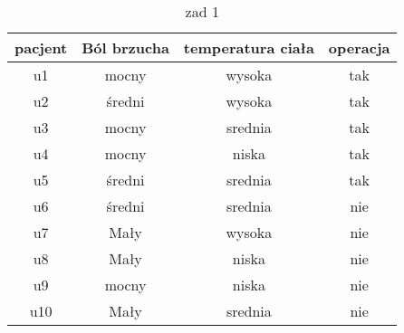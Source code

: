\documentclass[12pt, letterpaper, titlepage]{article}
\begin{document}
\begin{table}[h]
\centering\caption{zad 1}
\begin{tabular} {c|ccc}
\hline
\hline
pacjent & Ból brzucha  &   temperatura ciała  & operacja \\
\hline
u1 & mocny   &   wysoka    &  tak\\
u2 & średni  &   wysoka    &  tak\\
u3 & mocny   &   srednia   &  tak\\
u4 & mocny   &   niska     &  tak\\
u5 & średni  &   srednia   &  tak\\
u6 & średni  &   srednia   &  nie\\
u7 & Mały    &   wysoka    &  nie\\
u8 & Mały    &   niska     &  nie\\
u9 & mocny   &   niska     &  nie\\
u10 & Mały   &   srednia   &  nie\\
\hline
\hline
\end{tabular} 
\end{table}
\end{document}
